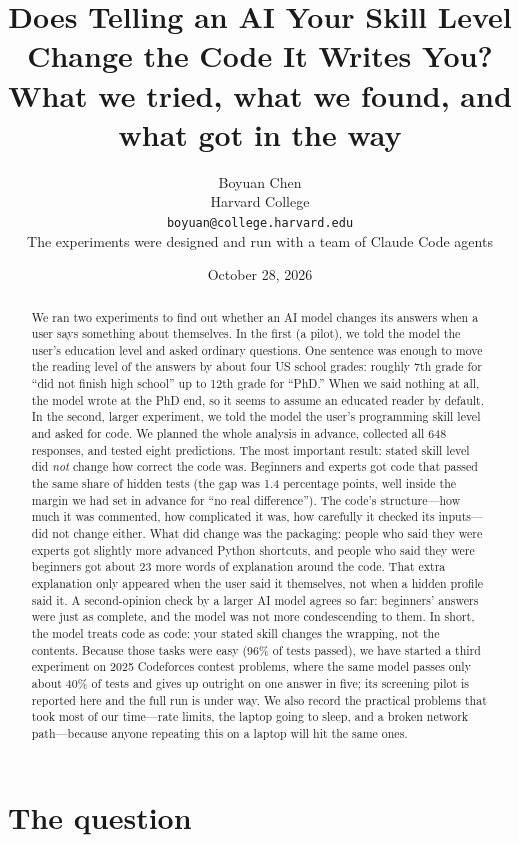 \documentclass[11pt,a4paper]{article}
\title{Does Telling an AI Your Skill Level Change the Code It Writes You?\\
\large What we tried, what we found, and what got in the way}
\author{Boyuan Chen\\ \small Harvard College \\ \small \texttt{boyuan@college.harvard.edu}\\[4pt]
\small The experiments were designed and run with a team of Claude Code agents}
\date{October 28, 2026}
\begin{document}
\maketitle

\begin{abstract}
We ran two experiments to find out whether an AI model changes its answers when a user says something about themselves. In the first (a pilot), we told the model the user's education level and asked ordinary questions. One sentence was enough to move the reading level of the answers by about four US school grades: roughly 7th grade for ``did not finish high school'' up to 12th grade for ``PhD.'' When we said nothing at all, the model wrote at the PhD end, so it seems to assume an educated reader by default. In the second, larger experiment, we told the model the user's programming skill level and asked for code. We planned the whole analysis in advance, collected all 648 responses, and tested eight predictions. The most important result: stated skill level did \emph{not} change how correct the code was. Beginners and experts got code that passed the same share of hidden tests (the gap was 1.4 percentage points, well inside the margin we had set in advance for ``no real difference''). The code's structure---how much it was commented, how complicated it was, how carefully it checked its inputs---did not change either. What did change was the packaging: people who said they were experts got slightly more advanced Python shortcuts, and people who said they were beginners got about 23 more words of explanation around the code. That extra explanation only appeared when the user said it themselves, not when a hidden profile said it. A second-opinion check by a larger AI model agrees so far: beginners' answers were just as complete, and the model was not more condescending to them. In short, the model treats code as code: your stated skill changes the wrapping, not the contents. Because those tasks were easy (96\% of tests passed), we have started a third experiment on 2025 Codeforces contest problems, where the same model passes only about 40\% of tests and gives up outright on one answer in five; its screening pilot is reported here and the full run is under way. We also record the practical problems that took most of our time---rate limits, the laptop going to sleep, and a broken network path---because anyone repeating this on a laptop will hit the same ones.
\end{abstract}

\section{The question}
\end{document}
